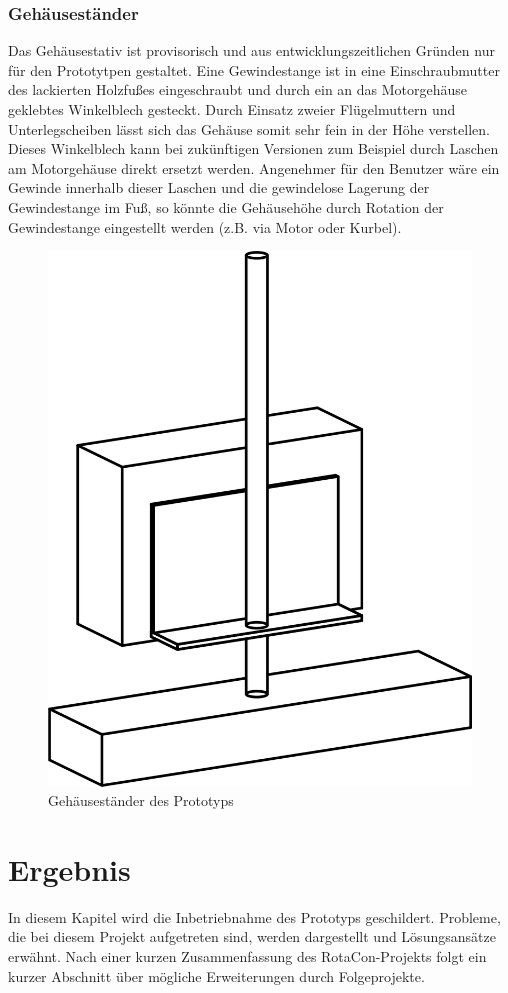 \documentclass[11pt, titlepage]{report}
\begin{document}
			\subsection{Gehäuseständer}
				Das Gehäusestativ ist provisorisch und aus entwicklungszeitlichen Gründen nur für den Prototytpen gestaltet. Eine Gewindestange ist in eine Einschraubmutter des lackierten Holzfußes eingeschraubt und durch ein an das Motorgehäuse geklebtes Winkelblech gesteckt. Durch Einsatz zweier Flügelmuttern und Unterlegscheiben lässt sich das Gehäuse somit sehr fein in der Höhe verstellen. Dieses Winkelblech kann bei zukünftigen Versionen zum Beispiel durch Laschen am Motorgehäuse direkt ersetzt werden. Angenehmer für den Benutzer wäre ein Gewinde innerhalb dieser Laschen und die gewindelose Lagerung der Gewindestange im Fuß, so könnte die Gehäusehöhe durch Rotation der Gewindestange eingestellt werden (z.B. via Motor oder Kurbel).
				\vspace{3em}
				\begin{figure}[htbp]
					\centering
					\includegraphics[width=0.75\linewidth]{./img/RotaCon.png}
					\caption{Gehäuseständer des Prototyps
					\label{fig:imgRotaCon}}			
				\end{figure}
		\newpage
	\chapter{Ergebnis}
	\label{sec:Epilog}
		In diesem Kapitel wird die Inbetriebnahme des Prototyps geschildert. Probleme, die bei diesem Projekt aufgetreten sind, werden dargestellt und Lösungsansätze erwähnt. Nach einer kurzen Zusammenfassung des RotaCon-Projekts folgt ein kurzer Abschnitt über mögliche Erweiterungen durch Folgeprojekte.
\end{document}
